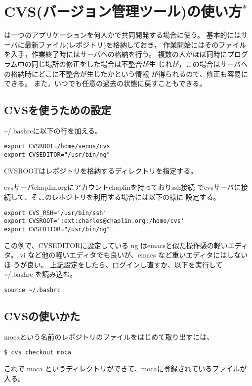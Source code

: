 \documentclass{jreport}
\begin{document}
\chapter{CVS(バージョン管理ツール)の使い方$^*$}

は一つのアプリケーションを何人かで共同開発する場合に使う。
基本的にはサーバに最新ファイル(レポジトリ)を格納しておき，
作業開始にはそのファイルを入手，作業終了時にはサーバへの格納を行う。
複数の人がほぼ同時にプログラム中の同じ場所の修正をした場合は不整合が生
じれが，この場合はサーバへの格納時にどこに不整合が生じたかという情報
が得られるので、修正も容易にできる。
また，いつでも任意の過去の状態に戻すこともできる。


\section{CVSを使うための設定}

{\ttfamily \~{}/.bashrc}に以下の行を加える。
\begin{screen}
\begin{verbatim}
export CVSROOT=/home/venus/cvs
export CVSEDITOR="/usr/bin/ng"
\end{verbatim}
\end{screen}
CVSROOTはレポジトリを格納するディレクトリを指定する。

cvsサーバchaplin.orgにアカウントchaplinを持っておりssh接続
でcvsサーバに接続して、そこのレポジトリを利用する場合には以下の様に
設定する。
\begin{screen}
\begin{verbatim}
export CVS_RSH='/usr/bin/ssh'
export CVSROOT=':ext:charles@chaplin.org:/home/cvs'
export CVSEDITOR="/usr/bin/ng"
\end{verbatim}
\end{screen}
この例で、CVSEDITORに設定している ng はemacsと似た操作感の軽いエディタ。
vi など他の軽いエディタでも良いが、emacs など重いエディタにはしないほ
うが良い。
上記設定をしたら、ログインし直すか、以下を実行して {\ttfamily \~{}/.bashrc}
を読み込む。
\begin{screen}
\begin{verbatim}
source ~/.bashrc
\end{verbatim}
\end{screen}

\section{CVSの使いかた}
mocaという名前のレポジトリのファイルをはじめて取り出すには、
\begin{screen}
\begin{verbatim}
$ cvs checkout moca
\end{verbatim}
\end{screen}
これで moca というディレクトリができて、mocaに登録されているファイルが
入る。
\end{document}
